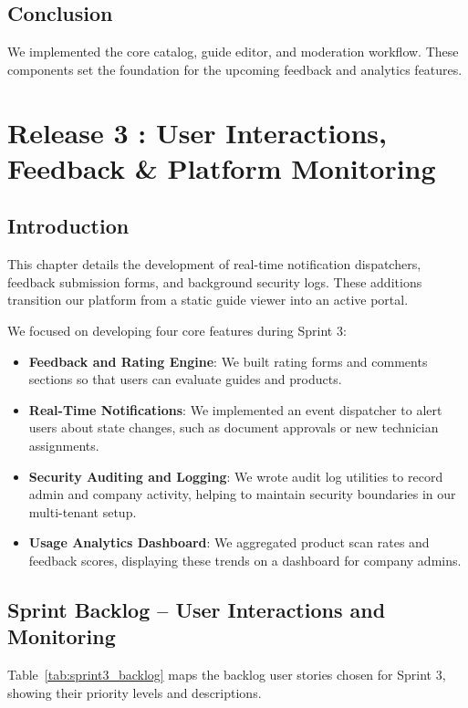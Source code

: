 \documentclass[12pt,a4paper]{report}
\begin{document}
\section{Conclusion}

We implemented the core catalog, guide editor, and moderation workflow. These components set the foundation for the upcoming feedback and analytics features.

\chapter{Release 3 : User Interactions, Feedback \& Platform Monitoring}

\section{Introduction}

This chapter details the development of real-time notification dispatchers, feedback submission forms, and background security logs. These additions transition our platform from a static guide viewer into an active portal.

We focused on developing four core features during Sprint 3:
\begin{itemize}
    \item \textbf{Feedback and Rating Engine}: We built rating forms and comments sections so that users can evaluate guides and products.
    \item \textbf{Real-Time Notifications}: We implemented an event dispatcher to alert users about state changes, such as document approvals or new technician assignments.
    \item \textbf{Security Auditing and Logging}: We wrote audit log utilities to record admin and company activity, helping to maintain security boundaries in our multi-tenant setup.
    \item \textbf{Usage Analytics Dashboard}: We aggregated product scan rates and feedback scores, displaying these trends on a dashboard for company admins.
\end{itemize}

\section{Sprint Backlog -- User Interactions and Monitoring}

Table~\ref{tab:sprint3_backlog} maps the backlog user stories chosen for Sprint 3, showing their priority levels and descriptions.
\end{document}
